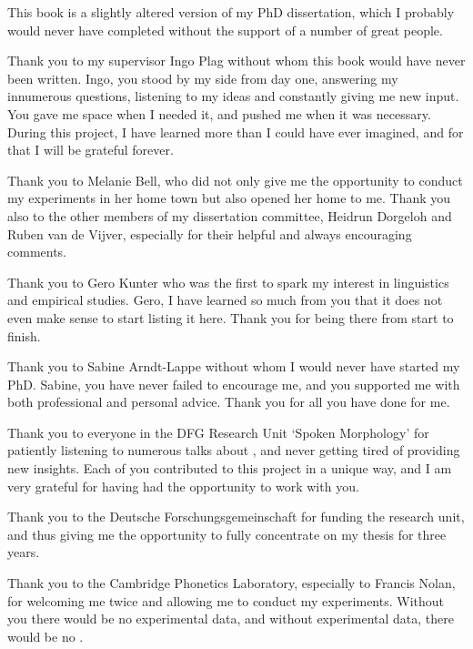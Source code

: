 \addchap{\lsAcknowledgementTitle} 

\vspace*{-0.4cm}
This book is a slightly altered version of my PhD dissertation, which I probably would never have completed without the support of a number of great people.

Thank you to my supervisor Ingo Plag without whom this book would have never been written. Ingo, you stood by my side from day one, answering my innumerous questions,  listening to my ideas and constantly giving me new input. You gave me space when I needed it, and pushed me when it was necessary. During this project, I have learned more than I could have ever imagined, and for that I will be grateful forever.

Thank you to Melanie Bell, who did not only give me the opportunity to conduct my experiments in her home town but also opened her home to me. 
Thank you also to the other members of my dissertation committee, Heidrun Dorgeloh and Ruben van de Vijver, especially for their helpful and always encouraging comments. 

Thank you to Gero Kunter who was the first to spark my interest in linguistics and empirical studies. Gero, I have learned so much from you that it does not even make sense to start listing it here. Thank you for being there from start to finish.

Thank you to Sabine Arndt-Lappe without whom I would never have started my PhD. Sabine, you have never failed to encourage me, and you supported me with both professional and personal advice. Thank you for all you have done for me.

Thank you to everyone in the DFG Research Unit `Spoken Morphology' for patiently listening to numerous talks about , and never getting tired of providing new insights. Each of you contributed to this project in a unique way, and I am very grateful for having had the opportunity to work with you.

Thank you to the Deutsche Forschungsgemeinschaft for funding the research unit, and thus giving me the opportunity to fully concentrate on my thesis for three years.

Thank you to the Cambridge Phonetics Laboratory, especially to Francis Nolan, for welcoming me twice and allowing me to conduct my experiments. Without you there would be no experimental data, and without experimental data, there would be no .


